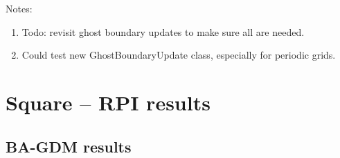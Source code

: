 \documentclass[11pt]{article}
\begin{document}
\bigskip\noindent 
Notes:
\begin{enumerate}
  \item Todo: revisit ghost boundary updates to make sure all are needed.
  \item Could test new GhostBoundaryUpdate class, especially for periodic grids.
\end{enumerate}  




\clearpage
\section{Square -- RPI results}

\newcommand{\tableFont}{\footnotesize}

















\clearpage
\subsection{BA-GDM results}





\clearpage
\end{document}
